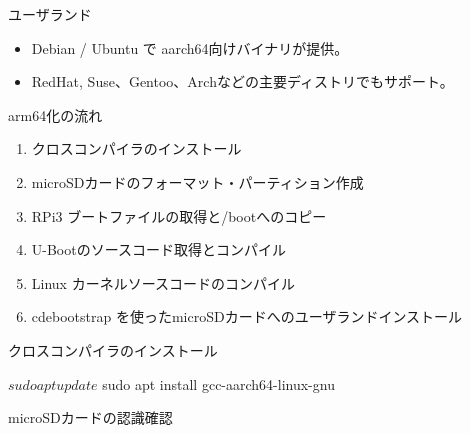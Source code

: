 \begin{frame}{ユーザランド}

\begin{itemize}
  \item Debian / Ubuntu で aarch64向けバイナリが提供。
  \item RedHat, Suse、Gentoo、Archなどの主要ディストリでもサポート。
\end{itemize}

\end{frame}


\begin{frame}{arm64化の流れ}

\begin{enumerate}
  \item クロスコンパイラのインストール
  \item microSDカードのフォーマット・パーティション作成
  \item RPi3 ブートファイルの取得と/bootへのコピー
  \item U-Bootのソースコード取得とコンパイル
  \item Linux カーネルソースコードのコンパイル
  \item cdebootstrap を使ったmicroSDカードへのユーザランドインストール
\end{enumerate}

\end{frame}


\begin{frame}[containsverbatim]{クロスコンパイラのインストール}
  \begin{commandline}
  $ sudo apt update
  $ sudo apt install gcc-aarch64-linux-gnu
  \end{commandline}
\end{frame}


\begin{frame}[containsverbatim]{microSDカードの認識確認}


\end{frame}

